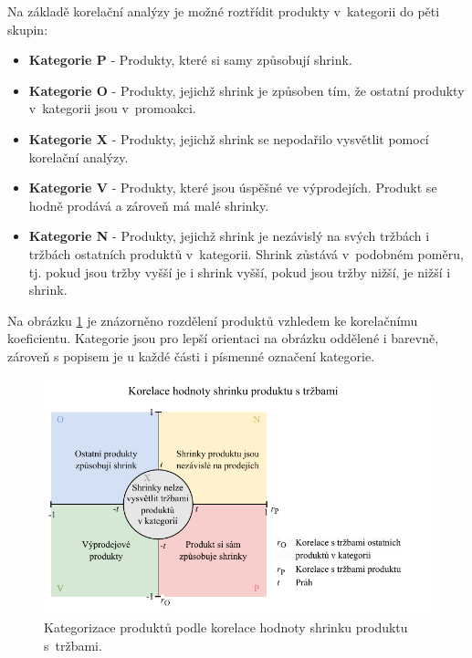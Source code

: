 Na základě korelační analýzy je možné roztřídit produkty v~kategorii do pěti skupin:
\begin{itemize}
    \itemsep0em 
    \item[] \textbf{Kategorie P} - Produkty, které si samy způsobují shrink.
    \item[] \textbf{Kategorie O} - Produkty, jejichž shrink je způsoben tím, že ostatní produkty v~kategorii jsou v~promoakci.
    \item[] \textbf{Kategorie X} - Produkty, jejichž shrink se nepodařilo vysvětlit pomocí korelační analýzy.
    \item[] \textbf{Kategorie V} - Produkty, které jsou úspěšné ve výprodejích. Produkt se hodně prodává a zároveň má malé shrinky.
    \item[] \textbf{Kategorie N} - Produkty, jejichž shrink je nezávislý na svých tržbách i tržbách ostatních produktů v~kategorii. Shrink zůstává v~podobném poměru, tj. pokud jsou tržby vyšší je i shrink vyšší, pokud jsou tržby nižší, je nižší i shrink.
\end{itemize}

Na obrázku \ref*{obr:ctg:g:kategorizace1} je znázorněno rozdělení produktů vzhledem ke korelačnímu koeficientu. Kategorie jsou pro lepší orientaci na obrázku oddělené i barevně, zároveň s popisem je u každé části i písmenné označení kategorie. 

\begin{figure}[hbtp!]
    \centering
    \captionsetup{justification=centering}
    \includegraphics[width=\textwidth]{obrazky/grafy/matice_korelace_typy_DP_colored.pdf}
    \caption{Kategorizace produktů podle korelace hodnoty shrinku produktu s~tržbami.}
    \label{obr:ctg:g:kategorizace1}
\end{figure}


